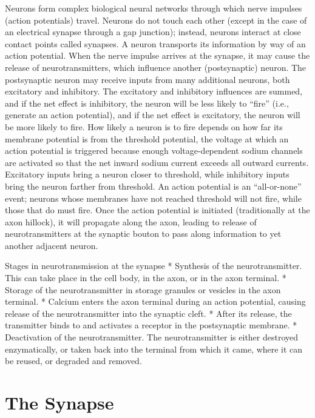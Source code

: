 Neurons form complex biological neural networks through which nerve impulses (action potentials) travel. Neurons do not touch each other (except in the case of an electrical synapse through a gap junction); instead, neurons interact at close contact points called synapses. A neuron transports its information by way of an action potential. When the nerve impulse arrives at the synapse, it may cause the release of neurotransmitters, which influence another (postsynaptic) neuron. The postsynaptic neuron may receive inputs from many additional neurons, both excitatory and inhibitory. The excitatory and inhibitory influences are summed, and if the net effect is inhibitory, the neuron will be less likely to ``fire'' (i.e., generate an action potential), and if the net effect is excitatory, the neuron will be more likely to fire. How likely a neuron is to fire depends on how far its membrane potential is from the threshold potential, the voltage at which an action potential is triggered because enough voltage-dependent sodium channels are activated so that the net inward sodium current exceeds all outward currents. Excitatory inputs bring a neuron closer to threshold, while inhibitory inputs bring the neuron farther from threshold. An action potential is an ``all-or-none'' event; neurons whose membranes have not reached threshold will not fire, while those that do must fire. Once the action potential is initiated (traditionally at the axon hillock), it will propagate along the axon, leading to release of neurotransmitters at the synaptic bouton to pass along information to yet another adjacent neuron.

Stages in neurotransmission at the synapse
* Synthesis of the neurotransmitter. This can take place in the cell body, in the axon, or in the axon terminal.
* Storage of the neurotransmitter in storage granules or vesicles in the axon terminal.
* Calcium enters the axon terminal during an action potential, causing release of the neurotransmitter into the synaptic cleft.
* After its release, the transmitter binds to and activates a receptor in the postsynaptic membrane.
* Deactivation of the neurotransmitter. The neurotransmitter is either destroyed enzymatically, or taken back into the terminal from which it came, where it can be reused, or degraded and removed.

\hypertarget{the-synapse}{%
\section{The Synapse}\label{the-synapse}}

